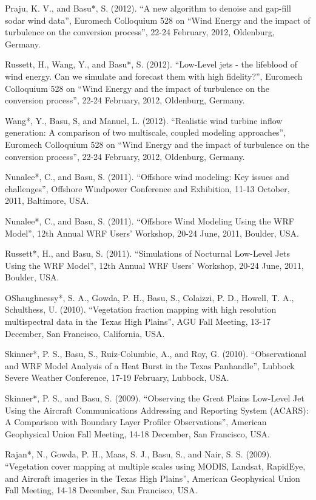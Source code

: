 \begin{etaremune}[topsep=0pt,itemsep=0pt,partopsep=0pt,parsep=0pt]
\item Praju, K. V., and Basu*, S. (2012). ``A new algorithm to denoise and gap-fill sodar wind data'', Euromech Colloquium 528 on ``Wind Energy and the impact of turbulence on the conversion process'', 22-24 February, 2012, Oldenburg, Germany.
\item Russett, H., Wang, Y., and Basu*, S. (2012). ``Low-Level jets - the lifeblood of wind energy. Can we simulate and forecast them with high fidelity?'', Euromech Colloquium 528 on ``Wind Energy and the impact of turbulence on the conversion process'', 22-24 February, 2012, Oldenburg, Germany.
\item Wang*, Y., Basu, S, and Manuel, L. (2012). ``Realistic wind turbine inflow generation: A comparison of two multiscale, coupled modeling approaches'', Euromech Colloquium 528 on ``Wind Energy and the impact of turbulence on the conversion process'', 22-24 February, 2012, Oldenburg, Germany.
\item Nunalee*, C., and Basu, S. (2011). ``Offshore wind modeling: Key issues and challenges'', Offshore Windpower Conference and Exhibition, 11-13 October, 2011, Baltimore, USA. 
\item Nunalee*, C., and Basu, S. (2011). ``Offshore Wind Modeling Using the WRF Model'', 12th Annual WRF Users' Workshop, 20-24 June, 2011, Boulder, USA.
\item Russett*, H., and Basu, S. (2011). ``Simulations of Nocturnal Low-Level Jets Using the WRF Model'', 12th Annual WRF Users' Workshop, 20-24 June, 2011, Boulder, USA.
\item OShaughnessy*, S. A., Gowda, P. H., Basu, S., Colaizzi, P. D., Howell, T. A., Schulthess, U. (2010). ``Vegetation fraction mapping with high resolution multispectral data in the Texas High Plains'', AGU Fall Meeting, 13-17 December, San Francisco, California, USA.
\item Skinner*, P. S., Basu, S., Ruiz-Columbie, A., and Roy, G. (2010). ``Observational and WRF Model Analysis of a Heat Burst in the Texas Panhandle'', Lubbock Severe Weather Conference, 17-19 February, Lubbock, USA. 
\item Skinner*, P. S., and Basu, S. (2009). ``Observing the Great Plains Low-Level Jet Using the Aircraft Communications Addressing and Reporting System (ACARS): A Comparison with Boundary Layer Profiler Observations'', American Geophysical Union Fall Meeting, 14-18 December, San Francisco, USA.
\item Rajan*, N., Gowda, P. H., Maas, S. J., Basu, S., and Nair, S. S. (2009). ``Vegetation cover mapping at multiple scales using MODIS, Landsat, RapidEye, and Aircraft imageries in the Texas High Plains'', American Geophysical Union Fall Meeting, 14-18 December, San Francisco, USA.

\end{etaremune}
